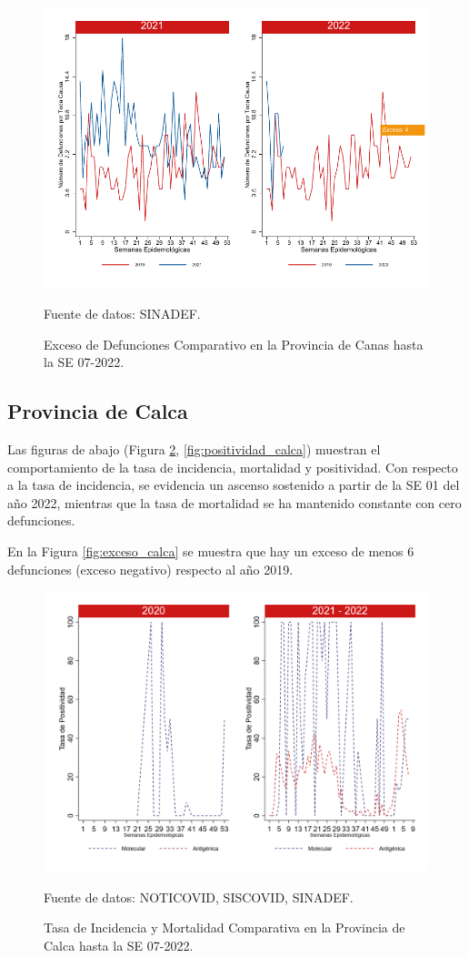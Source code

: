 \documentclass[12pt,a4paper,openany]{book}
\begin{document}
		\begin{figure}[h]
			\caption{Exceso de Defunciones Comparativo en la Provincia de Canas hasta la SE 07-2022.}\label{fig:exceso_canas}
			\begin{center}
				\includegraphics[width=0.7\linewidth]{../figuras/exceso_3.pdf}
			\end{center}
			{\footnotesize {Fuente de datos: SINADEF.}}
		\end{figure}
		
		\clearpage
		
		\subsection*{Provincia de Calca}
		\noindent Las figuras de abajo (Figura \ref{fig:inc_mort_calca}, \ref{fig:positividad_calca}) muestran el comportamiento de la tasa de incidencia, mortalidad y  positividad. Con respecto a la tasa de incidencia, se evidencia un ascenso sostenido a partir de la SE 01 del año 2022, mientras que la tasa de mortalidad se ha mantenido constante con cero defunciones. 
		
		En la Figura \ref{fig:exceso_calca} se muestra que hay un exceso de menos 6 defunciones (exceso negativo) respecto al año 2019.
		
		\begin{figure}[h]
			\caption{Tasa de Incidencia y Mortalidad Comparativa en la Provincia de Calca hasta la SE 07-2022.}\label{fig:inc_mort_calca}
			\begin{center}
				\includegraphics[width=0.7\linewidth]{../figuras/incidencia_mortalidad_20_21_4.png}
			\end{center}
			{\footnotesize {Fuente de datos: NOTICOVID, SISCOVID, SINADEF.}}
		\end{figure}
		
\end{document}
